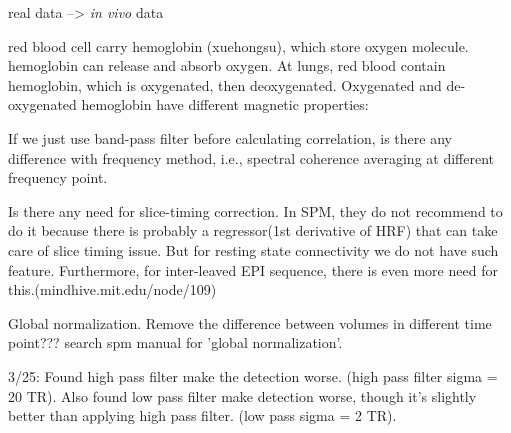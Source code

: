 \documentclass[12pt]{article}
\begin{document}
real data --> \textit{in vivo} data

red blood cell carry hemoglobin (xuehongsu), which store oxygen molecule. hemoglobin can release and absorb oxygen. At lungs, red blood contain hemoglobin, which is oxygenated, then deoxygenated. Oxygenated and de-oxygenated hemoglobin have different magnetic properties: 

If we just use band-pass filter before calculating correlation, is there any difference with frequency method, i.e., spectral coherence averaging at different frequency point.

Is there any need for slice-timing correction. In SPM, they do not recommend to do it because there is probably a regressor(1st derivative of HRF) that can take care of slice timing issue. But for resting state connectivity we do not have such feature. Furthermore, for inter-leaved EPI sequence, there is even more need for this.(mindhive.mit.edu/node/109)

Global normalization. Remove the difference between volumes in different time point??? search spm manual for 'global normalization'.

3/25: Found high pass filter make the detection worse. (high pass filter sigma = 20 TR). Also found low pass filter make detection worse, though it's slightly better than applying high pass filter. (low pass sigma = 2 TR).



\end{document}

